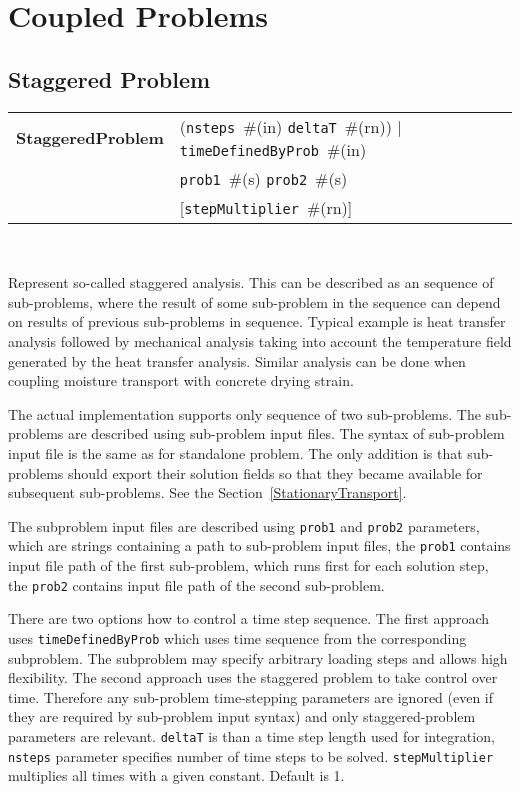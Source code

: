 \documentclass[a4paper]{report}
\newcommand{\param}[1]{\texttt{#1}} %
\newcommand{\optional}[1]{[#1]} %
\newcommand{\field}[2]{\param{#1}~\#{\tiny(#2)}} %
\newcommand{\optField}[2]{\optional{\field{#1}{#2}}}
\newcommand{\entKeywordInst}[1]{\textbf{#1}} %
\newenvironment{record}[1][]{\begin{tabular}{|ll}}{\end{tabular}\\}
\newcommand{\recentry}[2]{{#1}&{#2}\\}
\newcounter{rcc}
\newenvironment{record}[1][\textwidth]{\setcounter{rcc}{0}\rowcolors{1}{lightgray}{lightgray}\tabularx{#1}{llR} \hline}
               {\endtabularx}
\newcommand{\recentry}[2]{\ifthenelse{\value{rcc}>0}{$\backslash$ \\}{\setcounter{rcc}{1}}{#1}&{#2}&}
\begin{document}
\section{Coupled Problems}
\subsection{Staggered Problem}
\label{staggeredproblem}
\begin{record}
  \recentry{\entKeywordInst{StaggeredProblem}}{(\field{nsteps}{in} \field{deltaT}{rn}) $|$ \field{timeDefinedByProb}{in}}
  \recentry{}{\field{prob1}{s} \field{prob2}{s}}
  \recentry{}{\optField{stepMultiplier}{rn}}
\end{record}

Represent so-called staggered analysis. This can be described as an
sequence of sub-problems, where the result of some sub-problem in the
sequence can depend on results of previous sub-problems in sequence.
Typical example is heat transfer analysis followed by mechanical
analysis taking into account the temperature field generated by the
heat transfer analysis. Similar analysis can be done when coupling
moisture transport with concrete drying strain.

The actual implementation supports only sequence of two sub-problems.
The sub-problems are described using sub-problem input files. The
syntax of sub-problem input file is the same as for standalone
problem. The only addition is that sub-problems should export their
solution fields so that they became available for subsequent
sub-problems. See the Section~\ref{StationaryTransport}.

The subproblem input files are described using
\param{prob1} and \param{prob2} parameters, which are strings
containing a path to sub-problem input files, the \param{prob1}
contains input file path of the first sub-problem, which runs first
for each solution step, the \param{prob2} contains input file path of
the second sub-problem. 

There are two options how to control a time step sequence. The first approach
uses \param{timeDefinedByProb} which uses time sequence from the corresponding subproblem. 
The subproblem may specify arbitrary loading steps and allows high flexibility.
The second approach uses the staggered problem to take control over time. Therefore any
sub-problem time-stepping parameters are ignored (even if they are
required by sub-problem input syntax) and only staggered-problem
parameters are relevant. \param{deltaT} is than a time step length used for
integration, \param{nsteps} parameter specifies
number of time steps to be solved. \param{stepMultiplier} multiplies all 
times with a given constant. Default is 1.
\end{document}
